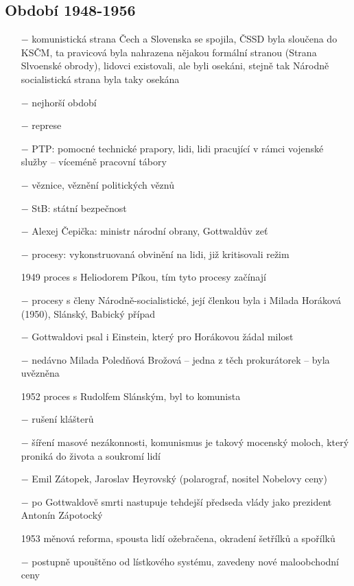 \documentclass{article}
\begin{document}
\subsection*{Období 1948-1956}
\begin{itemize}
    \vspace{-0.5em}
    \setlength\itemsep{0.15em}
    \item[$-$] komunistická strana Čech a Slovenska se spojila, ČSSD byla sloučena do KSČM, ta pravicová byla nahrazena nějakou formální stranou (Strana Slvoenské obrody), lidovci existovali, ale byli osekáni, stejně tak Národně socialistická strana byla taky osekána
    \item[$-$] nejhorší období
    \item[$-$] represe
    \item[$-$] PTP: pomocné technické prapory, lidi, lidi pracující v rámci vojenské služby -- víceméně pracovní tábory
    \item[$-$] věznice, věznění politických věznů
    \item[$-$] StB: státní bezpečnost
    \item[$-$] Alexej Čepička: ministr národní obrany, Gottwaldův zeť
    \item[$-$] procesy: vykonstruovaná obvinění na lidi, již kritisovali režim
    \item[1949] proces s Heliodorem Píkou, tím tyto procesy začínají
    \item[$-$] procesy s členy Národně-socialistické, její členkou byla i Milada Horáková (1950), Slánský, Babický případ
    \item[$-$] Gottwaldovi psal i Einstein, který pro Horákovou žádal milost
    \item[$-$] nedávno Milada Poledňová Brožová -- jedna z těch prokurátorek -- byla uvězněna
    \item[1952] proces s Rudolfem Slánským, byl to komunista
    \item[$-$] rušení klášterů
    \item[$-$] šíření masové nezákonnosti, komunismus je takový mocenský moloch, který proniká do života a soukromí lidí
    \item[$-$] Emil Zátopek, Jaroslav Heyrovský (polarograf, nositel Nobelovy ceny)
    \item[$-$] po Gottwaldově smrti nastupuje tehdejší předseda vlády jako prezident Antonín Zápotocký
    \item[1953] měnová reforma, spousta lidí ožebračena, okradení šetřílků a spořílků
    \item[$-$] postupně upouštěno od lístkového systému, zavedeny nové maloobchodní ceny

\end{itemize}
\end{document}
